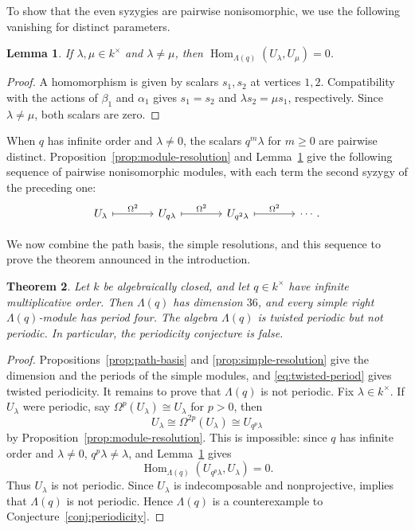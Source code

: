 \documentclass[a4paper,reqno,10pt]{amsart}
\newtheorem{theorem}{Theorem}[section]
\newtheorem{lemma}[theorem]{Lemma}
\theoremstyle{definition}
\numberwithin{equation}{section}
\newcommand{\kfield}{k}
\newcommand{\Hom}{\operatorname{Hom}}
\begin{document}
To show that the even syzygies are pairwise nonisomorphic, we use the
following vanishing for distinct parameters.

\begin{lemma}
\label{lem:hom-separation}
If $\lambda,\mu\in\kfield^\times$ and $\lambda\ne\mu$, then
$\Hom_{\Lambda(q)}(U_\lambda,U_\mu)=0$.
\end{lemma}

\begin{proof}
A homomorphism is given by scalars $s_1,s_2$ at vertices $1,2$.
Compatibility with the actions of $\beta_1$ and $\alpha_1$ gives
$s_1=s_2$ and $\lambda s_2=\mu s_1$, respectively. Since $\lambda\ne\mu$,
both scalars are zero.
\end{proof}

When $q$ has infinite order and $\lambda\ne0$, the scalars
$q^m\lambda$ for $m\geq0$ are pairwise distinct. Proposition~\ref{prop:module-resolution} and
Lemma~\ref{lem:hom-separation} give the following sequence of pairwise
nonisomorphic modules, with each term the second syzygy of the preceding one:
\[
\begin{tikzcd}[column sep=3.7em]
U_\lambda
 \arrow[r,mapsto,"\Omega^2"] &
U_{q\lambda}
 \arrow[r,mapsto,"\Omega^2"] &
U_{q^2\lambda}
 \arrow[r,mapsto,"\Omega^2"] &
\cdots .
\end{tikzcd}
\]

We now combine the path basis, the simple resolutions, and this sequence
to prove the theorem announced in the introduction.

\begin{theorem}
\label{thm:main}
Let $\kfield$ be algebraically closed, and let $q\in\kfield^\times$ have
infinite multiplicative order. Then $\Lambda(q)$ has dimension $36$, and
every simple right $\Lambda(q)$-module has period four. The algebra
$\Lambda(q)$ is twisted periodic but not periodic. In particular, the
periodicity conjecture is false.
\end{theorem}

\begin{proof}
Propositions~\ref{prop:path-basis} and \ref{prop:simple-resolution}
give the dimension and the periods of the simple modules, and
\eqref{eq:twisted-period} gives twisted periodicity. It remains to prove
that $\Lambda(q)$ is not periodic. Fix
$\lambda\in\kfield^\times$. If
$U_\lambda$ were periodic, say
$\Omega^p(U_\lambda)\cong U_\lambda$ for $p>0$, then
\[
 U_\lambda\cong\Omega^{2p}(U_\lambda)\cong U_{q^p\lambda}
\]
by Proposition~\ref{prop:module-resolution}. This is impossible: since $q$ has infinite order and $\lambda\ne0$,
$q^p\lambda\ne\lambda$, and Lemma~\ref{lem:hom-separation} gives
\[
 \Hom_{\Lambda(q)}(U_{q^p\lambda},U_\lambda)=0.
\]
Thus $U_\lambda$ is not periodic. Since $U_\lambda$ is indecomposable
and nonprojective, \cite[Theorem~IV.11.19(ii)]{SkowronskiYamagata}
implies that $\Lambda(q)$ is not periodic. Hence $\Lambda(q)$ is
a counterexample to Conjecture~\ref{conj:periodicity}.
\end{proof}
\end{document}
